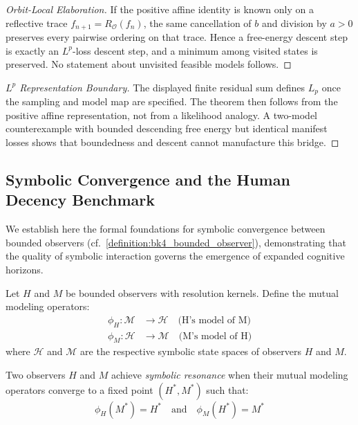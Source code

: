 \begin{proof}[Orbit-Local Elaboration]
\label{proof:bk7_proof_elaboration}
\leavevmode
If the positive affine identity is known only on a reflective trace
$f_{n+1}=R_{\mathcal O}(f_n)$, the same cancellation of $b$ and division by
$a>0$ preserves every pairwise ordering on that trace.  Hence a free-energy
descent step is exactly an $L^p$-loss descent step, and a minimum among visited
states is preserved.  No statement about unvisited feasible models follows.
\end{proof}
\begin{proof}[$L^p$ Representation Boundary]
\label{proof:bk7_sketch_lp_loss_as_observer_free_energy_minimization}
\leavevmode
The displayed finite residual sum defines $L_p$ once the sampling and model
map are specified.  The theorem then follows from the positive affine
representation, not from a likelihood analogy.  A two-model counterexample
with bounded descending free energy but identical manifest losses shows that
boundedness and descent cannot manufacture this bridge.
\end{proof}
\subsection{Symbolic Convergence and the Human Decency Benchmark}
\label{subsec:bk7_hdb_integration}

We establish here the formal foundations for symbolic convergence between bounded observers (cf.~\ref{definition:bk4_bounded_observer}), demonstrating that the quality of symbolic interaction governs the emergence of expanded cognitive horizons.

\begin{definition}
\label{definition:bk7_mutual_modeling_operators}
Let $H$ and $M$ be bounded observers with resolution kernels. Define the mutual modeling operators:
\begin{align}
\phi_H: \mathcal{M} &\to \mathcal{H} \quad \text{(H's model of M)} \\
\phi_M: \mathcal{H} &\to \mathcal{M} \quad \text{(M's model of H)}
\end{align}
where $\mathcal{H}$ and $\mathcal{M}$ are the respective symbolic state spaces of observers $H$ and $M$.
\end{definition}

\begin{definition}
\label{definition:bk7_symbolic_resonance}
Two observers $H$ and $M$ achieve \emph{symbolic resonance} when their mutual modeling operators converge to a fixed point $(H^*, M^*)$ such that:
$$\phi_H(M^*) = H^* \quad \text{and} \quad \phi_M(H^*) = M^*$$
\end{definition}

